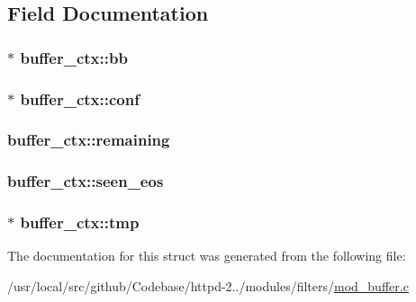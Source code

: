 \subsection{Field Documentation}
\subsubsection[{\texorpdfstring{bb}{bb}}]{$\ast$ buffer\+\_\+ctx\+::bb}\hypertarget{structbuffer__ctx_a9a86db743b69a1dc146ec4dc412a45be}{}\label{structbuffer__ctx_a9a86db743b69a1dc146ec4dc412a45be}
\subsubsection[{\texorpdfstring{conf}{conf}}]{$\ast$ buffer\+\_\+ctx\+::conf}\hypertarget{structbuffer__ctx_a7988fea5a734d716b21c595e6dafc526}{}\label{structbuffer__ctx_a7988fea5a734d716b21c595e6dafc526}
\subsubsection[{\texorpdfstring{remaining}{remaining}}]{ buffer\+\_\+ctx\+::remaining}\hypertarget{structbuffer__ctx_a3fd015ec10378277d9e7748be749c75d}{}\label{structbuffer__ctx_a3fd015ec10378277d9e7748be749c75d}
\subsubsection[{\texorpdfstring{seen\+\_\+eos}{seen_eos}}]{ buffer\+\_\+ctx\+::seen\+\_\+eos}\hypertarget{structbuffer__ctx_adcb2c2b04928a7d2470cc4aa8e7fad93}{}\label{structbuffer__ctx_adcb2c2b04928a7d2470cc4aa8e7fad93}
\subsubsection[{\texorpdfstring{tmp}{tmp}}]{$\ast$ buffer\+\_\+ctx\+::tmp}\hypertarget{structbuffer__ctx_a0c9832c89789eac73d5a94d6d130b1d5}{}\label{structbuffer__ctx_a0c9832c89789eac73d5a94d6d130b1d5}


The documentation for this struct was generated from the following file\+:\begin{DoxyCompactItemize}
\item 
/usr/local/src/github/\+Codebase/httpd-\/2../modules/filters/\hyperlink{mod__buffer_8c}{mod\+\_\+buffer.\+c}\end{DoxyCompactItemize}
